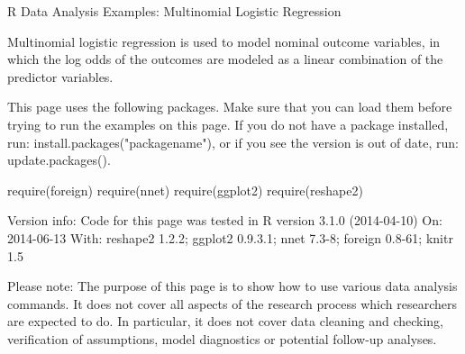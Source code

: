 R Data Analysis Examples: Multinomial Logistic Regression

Multinomial logistic regression is used to model nominal outcome variables, in which the log odds of the outcomes are modeled as a linear combination of the predictor variables.

This page uses the following packages. Make sure that you can load them before trying to run the examples on this page. If you do not have a package installed, run: install.packages("packagename"), or if you see the version is out of date, run: update.packages().
 


require(foreign)
require(nnet)
require(ggplot2)
require(reshape2)
 
Version info: Code for this page was tested in R version 3.1.0 (2014-04-10)
 On: 2014-06-13
 With: reshape2 1.2.2; ggplot2 0.9.3.1; nnet 7.3-8; foreign 0.8-61; knitr 1.5 

Please note: The purpose of this page is to show how to use various data analysis commands. It does not cover all aspects of the research process which researchers are expected to do. In particular, it does not cover data cleaning and checking, verification of assumptions, model diagnostics or potential follow-up analyses. 

